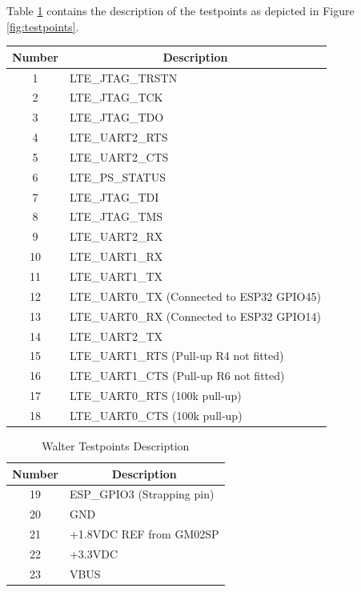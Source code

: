 \documentclass[11pt]{article}
\begin{document}
Table \ref{tab:testpoints} contains the description of the testpoints as depicted in Figure \ref{fig:testpoints}.
\begin{center}
\begin{tabular}{|c|p{9.5cm}|}
    \hline
    {\bf Number} & \multicolumn{1}{c|}{\bf Description} \\
    \hline
    \hline
    1 & LTE\_JTAG\_TRSTN\\
    \hline
    2 & LTE\_JTAG\_TCK\\
    \hline
    3 & LTE\_JTAG\_TDO\\
    \hline
    4 & LTE\_UART2\_RTS\\
    \hline
    5 & LTE\_UART2\_CTS\\
    \hline
    6 & LTE\_PS\_STATUS\\
    \hline
    7 & LTE\_JTAG\_TDI\\
    \hline
    8 & LTE\_JTAG\_TMS\\
    \hline
    9 & LTE\_UART2\_RX\\
    \hline
    10 & LTE\_UART1\_RX\\
    \hline
    11 & LTE\_UART1\_TX\\
    \hline
    12 & LTE\_UART0\_TX (Connected to ESP32 GPIO45)\\
    \hline
    13 & LTE\_UART0\_RX (Connected to ESP32 GPIO14)\\
    \hline
    14 & LTE\_UART2\_TX\\
    \hline
    15 & LTE\_UART1\_RTS (Pull-up R4 not fitted)\\
    \hline
    16 & LTE\_UART1\_CTS (Pull-up R6 not fitted)\\
    \hline
    17 & LTE\_UART0\_RTS (100k pull-up)\\
    \hline
    18 & LTE\_UART0\_CTS (100k pull-up)\\
    \hline
\end{tabular}
\end{center}
\newpage
\begin{table}[!h]
    \centering
    \begin{tabular}{|c|p{9.5cm}|}
    \hline
    {\bf Number} & \multicolumn{1}{c|}{\bf Description} \\
    \hline
    \hline
    19 & ESP\_GPIO3 (Strapping pin)\\
    \hline
    20 & GND\\
    \hline
    21 & +1.8VDC REF from GM02SP\\
    \hline
    22 & +3.3VDC\\
    \hline
    23 & VBUS\\
    \hline
    \end{tabular}
    \caption{Walter Testpoints Description}
    \label{tab:testpoints}
\end{table}
\end{document}

